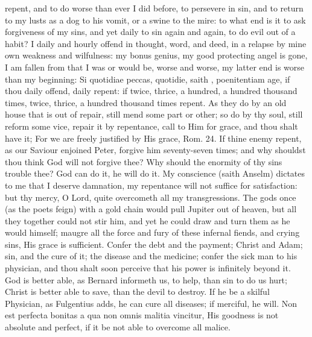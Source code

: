 {repent, and to do worse than ever I did before, to persevere in sin,
and to return to my lusts as a dog to his vomit, or a swine to the
mire: to what end is it to ask forgiveness of my sins, and yet
daily to sin again and again, to do evil out of a habit? I daily and
hourly offend in thought, word, and deed, in a relapse by mine own
weakness and wilfulness: my bonus genius, my good protecting angel is
gone, I am fallen from that I was or would be, worse and worse, my
latter end is worse than my beginning: Si quotidiae peccas, quotidie,
saith \Chrysostom{}, poenitentiam age, if thou daily offend, daily repent:
if twice, thrice, a hundred, a hundred thousand times, twice,
thrice, a hundred thousand times repent. As they do by an old house
that is out of repair, still mend some part or other; so do by thy
soul, still reform some vice, repair it by repentance, call to Him for
grace, and thou shalt have it; For we are freely justified by His
grace, Rom.  24. If thine enemy repent, as our Saviour enjoined
Peter, forgive him seventy-seven times; and why shouldst thou think God
will not forgive thee? Why should the enormity of thy sins trouble
thee? God can do it, he will do it. My conscience (saith Anselm)
dictates to me that I deserve damnation, my repentance will not suffice
for satisfaction: but thy mercy, O Lord, quite overcometh all my
transgressions. The gods once (as the poets feign) with a gold chain
would pull Jupiter out of heaven, but all they together could not stir
him, and yet he could draw and turn them as he would himself; maugre
all the force and fury of these infernal fiends, and crying sins, His
grace is sufficient. Confer the debt and the payment; Christ and Adam;
sin, and the cure of it; the disease and the medicine; confer the sick
man to his physician, and thou shalt soon perceive that his power is
infinitely beyond it. God is better able, as Bernard informeth
us, to help, than sin to do us hurt; Christ is better able to save,
than the devil to destroy. If he be a skilful Physician, as
Fulgentius adds, he can cure all diseases; if merciful, he will. Non
est perfecta bonitas a qua non omnis malitia vincitur, His goodness is
not absolute and perfect, if it be not able to overcome all malice.

}
